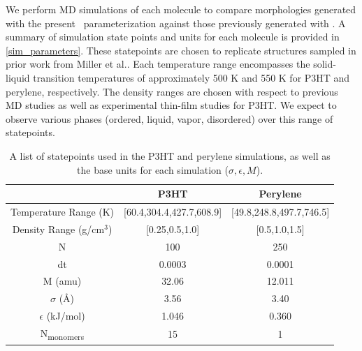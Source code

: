 We perform MD simulations of each molecule to compare morphologies generated with the present \espff~parameterization against those previously generated with \oplsff.
A summary of simulation state points and units for each molecule is provided in \autoref{sim_parameters}. 
These statepoints are chosen to replicate structures sampled in prior work from Miller et al.\cite{miller_optimization_2018}.
Each temperature range encompasses the solid-liquid transition temperatures of approximately 500 K and 550 K for P3HT and perylene, respectively. 
The density ranges are chosen with respect to previous MD studies as well as experimental thin-film studies for P3HT\cite{newbloom2012structure}. 
We expect to observe various phases (ordered, liquid, vapor, disordered) over this range of statepoints.

\begin{table}
  \centering
    \caption{A list of statepoints used in the P3HT and perylene simulations, as well as the base units for each simulation (\begin{math}\sigma , \epsilon , M\end{math}).}
  \begin{tabular}{c|c|c}
      & \textbf{P3HT} & \textbf{Perylene} \\
    \hline
    Temperature Range (K) & [60.4,304.4,427.7,608.9]& [49.8,248.8,497.7,746.5]\\
    \hline
    Density Range (g/cm$^3$) & [0.25,0.5,1.0] & [0.5,1.0,1.5]\\
    \hline
    N & 100 & 250 \\
    \hline
    dt & 0.0003 & 0.0001 \\
    \hline
    M (amu) & 32.06 & 12.011 \\
    \hline
    \(\sigma\) (\AA)& 3.56 & 3.40 \\
    \hline
    \(\epsilon\) (kJ/mol)& 1.046 & 0.360\\
    \hline
    N\textsubscript{monomers}& 15 & 1 \\
  \end{tabular}
  \label{sim_parameters}
\end{table}

